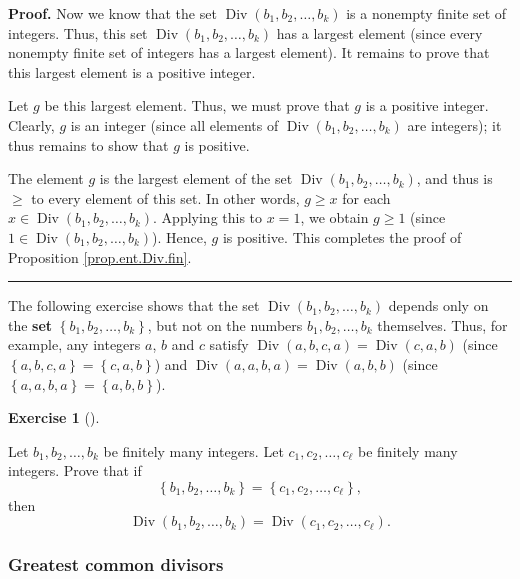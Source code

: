 \documentclass[numbers=enddot,12pt,final,onecolumn,notitlepage]{scrartcl}%
\newcounter{exer}
\numberwithin{exer}{subsection}
\theoremstyle{definition}
\newtheorem{exmp}[exer]{Exercise}
\newenvironment{exercise}[1][]
{\begin{exmp}[#1]\begin{leftbar}}
{\end{leftbar}\end{exmp}}
\newenvironment{proof}[1][Proof]{\noindent\textbf{#1.} }{\ \rule{0.5em}{0.5em}}
\begin{document}
\begin{proof}
Now we know that the set $\operatorname*{Div}\left(  b_{1},b_{2},\ldots
,b_{k}\right)  $ is a nonempty finite set of integers. Thus, this set
$\operatorname*{Div}\left(  b_{1},b_{2},\ldots,b_{k}\right)  $ has a largest
element (since every nonempty finite set of integers has a largest element).
It remains to prove that this largest element is a positive integer.

Let $g$ be this largest element. Thus, we must prove that $g$ is a positive
integer. Clearly, $g$ is an integer (since all elements of
$\operatorname*{Div}\left(  b_{1},b_{2},\ldots,b_{k}\right)  $ are integers);
it thus remains to show that $g$ is positive.

The element $g$ is the largest element of the set $\operatorname*{Div}\left(
b_{1},b_{2},\ldots,b_{k}\right)  $, and thus is $\geq$ to every element of
this set. In other words, $g\geq x$ for each $x\in\operatorname*{Div}\left(
b_{1},b_{2},\ldots,b_{k}\right)  $. Applying this to $x=1$, we obtain $g\geq1$
(since $1\in\operatorname*{Div}\left(  b_{1},b_{2},\ldots,b_{k}\right)  $).
Hence, $g$ is positive. This completes the proof of Proposition
\ref{prop.ent.Div.fin}.
\end{proof}

The following exercise shows that the set $\operatorname*{Div}\left(
b_{1},b_{2},\ldots,b_{k}\right)  $ depends only on the \textbf{set} $\left\{
b_{1},b_{2},\ldots,b_{k}\right\}  $, but not on the numbers $b_{1}%
,b_{2},\ldots,b_{k}$ themselves. Thus, for example, any integers $a$, $b$ and
$c$ satisfy $\operatorname*{Div}\left(  a,b,c,a\right)  =\operatorname*{Div}%
\left(  c,a,b\right)  $ (since $\left\{  a,b,c,a\right\}  =\left\{
c,a,b\right\}  $) and $\operatorname*{Div}\left(  a,a,b,a\right)
=\operatorname*{Div}\left(  a,b,b\right)  $ (since $\left\{  a,a,b,a\right\}
=\left\{  a,b,b\right\}  $).

\begin{exercise}
\label{exe.ent.Div.set}Let $b_{1},b_{2},\ldots,b_{k}$ be finitely many
integers. Let $c_{1},c_{2},\ldots,c_{\ell}$ be finitely many integers. Prove
that if%
\[
\left\{  b_{1},b_{2},\ldots,b_{k}\right\}  =\left\{  c_{1},c_{2}%
,\ldots,c_{\ell}\right\}  ,
\]
then%
\[
\operatorname*{Div}\left(  b_{1},b_{2},\ldots,b_{k}\right)
=\operatorname*{Div}\left(  c_{1},c_{2},\ldots,c_{\ell}\right)  .
\]

\end{exercise}

\subsubsection{Greatest common divisors}
\end{document}
